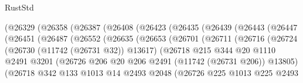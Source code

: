 \begin{lexlean}{RustStd}
\begin{coremodule}
                    (@26329
                      (@26358
                        (@26387
                          (@26408
                            (@26423
                              (@26435
                                (@26439
                                  (@26443
                                    (@26447
                                      (@26451
                                        (@26487
                                          (@26552
                                            (@26635
                                              (@26653
                                                (@26701
                                                  (@26711
                                                    (@26716
                                                      (@26724
                                                        (@26730 (@11742 (@26731 @32)) @13617)
                                                        (@26718
                                                          @215
                                                          @344
                                                          @20
                                                          @1110
                                                          @2491
                                                          @3201
                                                          (@26726
                                                            @206
                                                            @20
                                                            @206
                                                            @2491
                                                            (@11742 (@26731 @206))
                                                            @13805)
                                                          (@26718
                                                            @342
                                                            @133
                                                            @1013
                                                            @14
                                                            @2493
                                                            @2048
                                                            (@26726
                                                              @225
                                                              @1013
                                                              @225
                                                              @2493

\end{coremodule}
\end{lexlean}
